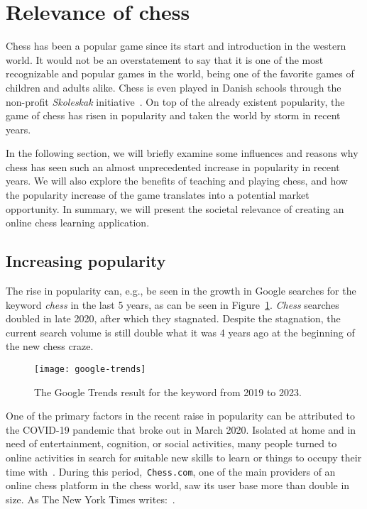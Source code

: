 \section{Relevance of chess}\label{sec:relevance-of-chess}

Chess has been a popular game since its start and introduction in the western world.
It would not be an overstatement to say that it is one of the most recognizable and popular games in the world, being
one of the favorite games of children and adults alike.
Chess is even played in Danish schools through the non-profit \textit{Skoleskak} initiative~\cite{skoleskak2024}.
On top of the already existent popularity, the game of chess has risen in popularity and taken
the world by storm in recent years.

In the following section, we will briefly examine some influences and reasons why chess has seen such an almost
unprecedented increase in popularity in recent years.
We will also explore the benefits of teaching and playing chess, and how the popularity increase of the game translates
into a potential market opportunity.
In summary, we will present the societal relevance of creating an online chess learning application.

\subsection{Increasing popularity}\label{subsec:increasing-popularity}

The rise in popularity can, e.g., be seen in the growth in Google searches for the keyword \textit{chess} in the last 5
years, as can be seen in Figure~\ref{fig:google-trends}.
\textit{Chess} searches doubled in late 2020, after which they stagnated.
Despite the stagnation, the current search volume is still double what it was 4 years ago at the beginning of the new
chess craze.

\begin{figure}
    \centering
    \texttt{[image: google-trends]}
    \caption{The Google Trends result for the keyword 
    from 2019 to 2023.}\label{fig:google-trends}
\end{figure}

One of the primary factors in the recent raise in popularity can be attributed to the COVID-19 pandemic that broke out
in March 2020.
Isolated at home and in need of entertainment, cognition, or social activities, many people turned to online activities
in search for suitable new skills to learn or things to occupy their time with~\cite{nyt2022}.
During this period,~\verb|Chess.com|, one of the main providers of an online chess platform in the chess world,
saw its user base more than double in size.
As The New York Times writes:~.

